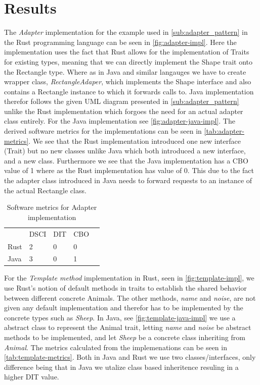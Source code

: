 \documentclass[conference]{IEEEtran}
\begin{document}
\section{Results}
The \emph{Adapter} implementation for the example used in \autoref{sub:adapter_pattern} in the Rust programming language can be seen in \autoref{fig:adapter-impl}.
Here the implementation uses the fact that Rust allows for the implementation of Traits for existing types, meaning that we can directly implement the Shape trait onto the Rectangle type.
Where as in Java and similar langauges we have to create wrapper class, \emph{RectangleAdaper}, which implements the Shape interface and also contains a Rectangle instance to which it forwards calls to.
Java implementation therefor follows the given UML diagram presented in \autoref{sub:adapter_pattern} unlike the Rust implementation which forgoes the need for an actual adapter class entirely.
For the Java implementation see \autoref{fig:adapter-java-impl}.
The derived software metrics for the implementations can be seen in \autoref{tab:adapter-metrics}.
We see that the Rust implementation introduced one new interface (Trait) but no new classes unlike Java which both introduced a new interface, and a new class.
Furthermore we see that the Java implementation has a CBO value of 1 where as the Rust implementation has value of 0.
This due to the fact the adapter class introduced in Java needs to forward requests to an instance of the actual Rectangle class.

\begin{table}[hbtp]
    \centering
    \caption{Software metrics for Adapter implementation}
    \label{tab:adapter-metrics}
    \begin{tabular}{lllll}
        & DSCI   & DIT  & CBO   &  \\
        Rust & 2 & 0    & 0     &  \\
        Java & 3 & 0    & 1     &  \\
    \end{tabular}
\end{table}

For the \emph{Template method} implementation in Rust, seen in \autoref{fig:template-impl}, we use Rust's notion of default methods in traits to establish the shared behavior between different concrete Animals.
The other methods, \emph{name} and \emph{noise}, are not given any default implementation and therefor has to be implemented by the concrete types such as \emph{Sheep}.
In Java, see \autoref{fig:template-java-impl} we use a abstract class to represent the Animal trait, letting \emph{name} and \emph{noise} be abstract methods to be implemented, and let \emph{Sheep} be a concrete class inheriting from \emph{Animal}.
The metrics calculated from the implemenations can be seen in \autoref{tab:template-metrics}.
Both in Java and Rust we use two classes/interfaces, only difference being that in Java we utalize class based inheritence resuling in a higher DIT value.
\end{document}
